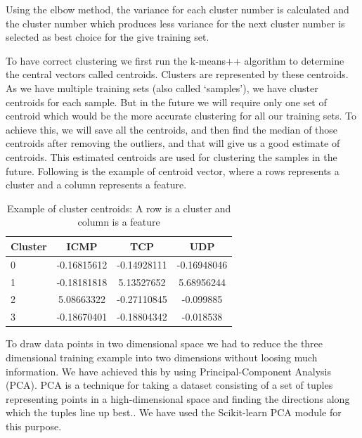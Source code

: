 \documentclass[12pt,oneside,a4paper]{article}
\begin{document}
Using the elbow method, the variance for each cluster number is calculated and the cluster number which produces less variance for the next cluster number is selected as best choice for the give training set.

To have correct clustering we first run the k-means++ algorithm to determine the central vectors called centroids. Clusters are represented by these centroids. As we have multiple training sets (also called `samples'), we have cluster centroids for each sample. But in the future we will require only one set of centroid which would be the more accurate clustering for all our training sets. To achieve this, we will save all the centroids, and then find the median of those centroids after removing the outliers, and that will give us a good estimate of centroids. This estimated centroids are used for clustering the samples in the future. Following is the example of centroid vector, where a rows represents a cluster and a column represents a feature.

\begin{table}[H]
\centering
  \begin{tabular}{ l | c  c  c }
    Cluster      & ICMP  & TCP  & UDP \\
    \hline
    0         &{-0.16815612}       &{-0.14928111}    &{-0.16948046} \\
    1         &{-0.18181818}       &{5.13527652}     &{5.68956244} \\
    2         &{5.08663322}        &{-0.27110845}    &{-0.099885} \\
    3         &{-0.18670401}       &{-0.18804342}    &{-0.018538} \\
  \end{tabular}
\caption{Example of cluster centroids: A row is a cluster and column is a feature} \label{table:centroids}
\end{table}

To draw data points in two dimensional space we had to reduce the three dimensional training example into two dimensions without loosing much information. We have achieved this by using Principal-Component Analysis (PCA). PCA is a technique for taking a dataset consisting of a set of tuples representing points in a high-dimensional space and finding the directions along which the tuples line up best.\cite{pca}. We have used the Scikit-learn PCA module for this purpose.
\end{document}
